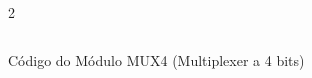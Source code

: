 \begin{figure}[H]
    \centering   
    \begin{tcolorbox}  
        \begin{multicols}{2} 
        \fontsize{9pt}{9pt}\selectfont\inputminted[obeytabs=true,tabsize=4,xleftmargin=20pt,linenos,breaklines]{VHDL}{VHDL/files/MUX4.vhd}    
        \end{multicols}
    \end{tcolorbox}   
    \caption{Código do Módulo MUX4 (Multiplexer a 4 bits)}
\end{figure}